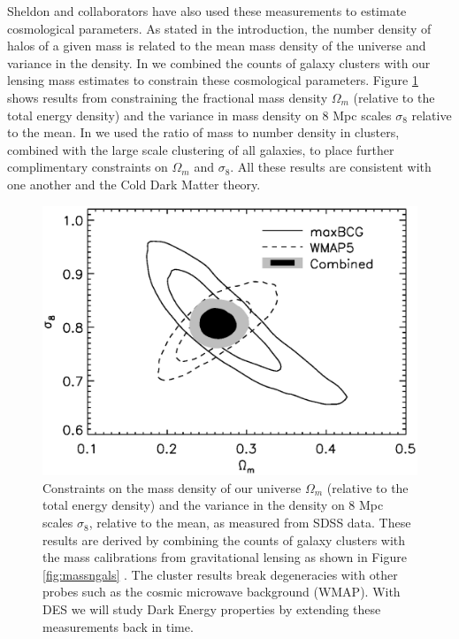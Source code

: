 \documentclass[12pt]{article}
\begin{document}
Sheldon and collaborators have also used these measurements to estimate
cosmological parameters.  As stated in the introduction, the number density of
halos of a given mass is related to the mean mass density of the universe and
variance in the density.  In \cite{RozoCosmo09} we combined the counts of
galaxy clusters with our lensing mass estimates to constrain these cosmological
parameters.  Figure \ref{fig:omegasigma8} shows results from \cite{RozoCosmo09}
constraining the fractional mass density $\Omega_m$ (relative to the total
energy density) and the variance in mass density on 8 Mpc scales $\sigma_8$
relative to the mean. In \cite{TinkerM2N2012} we used the ratio of mass to
number density in clusters, combined with the large scale clustering of all
galaxies, to place further complimentary constraints on $\Omega_m$ and
$\sigma_8$.  All these results are consistent with one another and the Cold
Dark Matter theory.

\begin{figure}[p] 
\centering 
\includegraphics[scale=0.6]{s8_Om.ps}

\caption{Constraints on the mass density of our universe $\Omega_m$ (relative
    to the total energy density) and the variance in the density on 8 Mpc
    scales $\sigma_8$, relative to the mean, as measured from SDSS data.  These
    results \cite{RozoCosmo09} are derived by combining the counts of galaxy
    clusters with the mass calibrations from gravitational lensing as shown in
    Figure \ref{fig:massngals} \cite{SheldonLensing07,JohnstonLensing07}.  The
    cluster results break degeneracies with other probes such as the cosmic
microwave background (WMAP).  With DES we will study Dark Energy properties by
extending these measurements back in time.  \label{fig:omegasigma8}} 

\end{figure}
\end{document}
